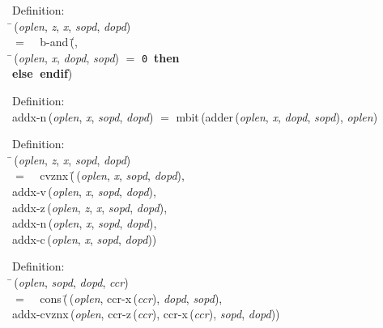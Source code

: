 \begin{tabbing}{\sc Definition}: \\  
\=\,({\it{oplen\/}}, {\it{z\/}}, {\it{x\/}}, {\it{sopd\/}}, {\it{dopd\/}}) \\ 
$=$$\;\;\;\;${\rm{b-and}}\,(\=, \\ 
\=\,({\it{oplen\/}}, {\it{x\/}}, {\it{dopd\/}}, {\it{sopd\/}}) $=$ {\tt{0}}$\;\;${\bf then }{} \\ 
{\bf else }{}$\;${\bf  endif}\-)\-\-
\end{tabbing}

\begin{tabbing}{\sc Definition}: \\  
{\rm{addx-n}}\,({\it{oplen\/}}, {\it{x\/}}, {\it{sopd\/}}, {\it{dopd\/}}) $=$ {\rm{mbit}}\,({\rm{adder}}\,({\it{oplen\/}}, {\it{x\/}}, {\it{dopd\/}}, {\it{sopd\/}}), {\it{oplen\/}})
\end{tabbing}

\begin{tabbing}{\sc Definition}: \\  
\=\,({\it{oplen\/}}, {\it{z\/}}, {\it{x\/}}, {\it{sopd\/}}, {\it{dopd\/}}) \\ 
$=$$\;\;\;\;${\rm{cvznx}}\,(\=\,({\it{oplen\/}}, {\it{x\/}}, {\it{sopd\/}}, {\it{dopd\/}}), \\ 
{\rm{addx-v}}\,({\it{oplen\/}}, {\it{x\/}}, {\it{sopd\/}}, {\it{dopd\/}}), \\ 
{\rm{addx-z}}\,({\it{oplen\/}}, {\it{z\/}}, {\it{x\/}}, {\it{sopd\/}}, {\it{dopd\/}}), \\ 
{\rm{addx-n}}\,({\it{oplen\/}}, {\it{x\/}}, {\it{sopd\/}}, {\it{dopd\/}}), \\ 
{\rm{addx-c}}\,({\it{oplen\/}}, {\it{x\/}}, {\it{sopd\/}}, {\it{dopd\/}}))\-\-
\end{tabbing}

\begin{tabbing}{\sc Definition}: \\  
\=\,({\it{oplen\/}}, {\it{sopd\/}}, {\it{dopd\/}}, {\it{ccr\/}}) \\ 
$=$$\;\;\;\;${\rm{cons}}\,(\=\,({\it{oplen\/}}, {\rm{ccr-x}}\,({\it{ccr\/}}), {\it{dopd\/}}, {\it{sopd\/}}), \\ 
{\rm{addx-cvznx}}\,({\it{oplen\/}}, {\rm{ccr-z}}\,({\it{ccr\/}}), {\rm{ccr-x}}\,({\it{ccr\/}}), {\it{sopd\/}}, {\it{dopd\/}}))\-\-
\end{tabbing}

